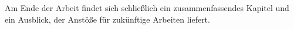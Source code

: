 Am Ende der Arbeit findet sich schließlich ein zusammenfassendes Kapitel und ein Ausblick, der Anstöße für zukünftige Arbeiten
liefert.

